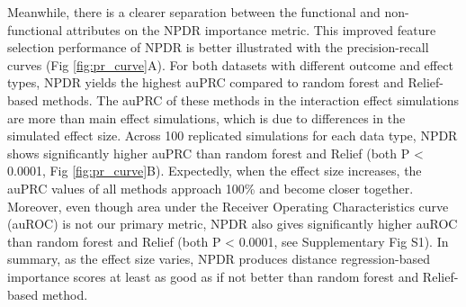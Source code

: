 \documentclass[10pt]{article}
\begin{document}
Meanwhile, there is a clearer separation between the functional and non-functional attributes on the NPDR importance metric.
This improved feature selection performance of NPDR is better illustrated with the precision-recall curves (Fig \ref{fig:pr_curve}A).
For both datasets with different outcome and effect types, NPDR yields the highest auPRC compared to random forest and Relief-based methods.
The auPRC of these methods in the interaction effect simulations are more than main effect simulations, which is due to differences in the simulated effect size.
Across 100 replicated simulations for each data type, NPDR shows significantly higher auPRC than random forest and Relief (both P < 0.0001, Fig \ref{fig:pr_curve}B).
Expectedly, when the effect size increases, the auPRC values of all methods approach 100\% and become closer together.
Moreover, even though area under the Receiver Operating Characteristics curve (auROC) is not our primary metric, NPDR also gives significantly higher auROC than random forest and Relief (both P < 0.0001, see Supplementary Fig S1).
In summary, as the effect size varies, NPDR produces distance regression-based importance scores at least as good as if not better than random forest and Relief-based method.
\end{document}
